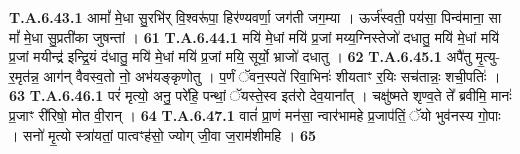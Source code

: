 \documentclass[17pt]{extarticle}
\begin{document}
                                                         \textbf{} \newline \newline
                                \textbf{ T.A.6.43.1} \newline
                  आमां᳚ मे॒धा सु॒रभि॑र् वि॒श्वरू॑पा॒ हिर॑ण्यवर्णा॒ जग॑ती जग॒म्या । ऊर्ज॑स्वती॒ पय॑सा॒ पिन्व॑माना॒ सा मां᳚ मे॒धा सु॒प्रती॑का जुषन्तां । \textbf{ 61} \newline
                  \newline
                                                         \textbf{} \newline \newline
                                \textbf{ T.A.6.44.1} \newline
                  मयि॑ मे॒धां मयि॑ प्र॒जां मय्य॒ग्निस्तेजो॑ दधातु॒ मयि॑ मे॒धां मयि॑ प्र॒जां मयीन्द्र॑ इन्द्रि॒यं द॑धातु॒ मयि॑ मे॒धां मयि॑ प्र॒जां मयि॒ सूर्यो॒ भ्राजो॑ दधातु । \textbf{ 62} \newline
                  \newline
                                                         \textbf{} \newline \newline
                                \textbf{ T.A.6.45.1} \newline
                  अपै॑तु मृ॒त्यु-र॒मृत॑न्न॒ आग॑न् वैवस्व॒तो नो॒ अभ॑यङ्कृणोतु । प॒र्णं ॅवन॒स्पते॑ रिवा॒भिनः॑ शीयताꣳ र॒यिः सच॑तान्नः॒ शची॒पतिः॑ । \textbf{ 63} \newline
                  \newline
                                                         \textbf{} \newline \newline
                                \textbf{ T.A.6.46.1} \newline
                  परं॑ मृत्यो॒ अनु॒ परे॑हि॒ पन्थां॒ ॅयस्ते॒स्व इत॑रो देव॒याना᳚त् । चक्षु॑ष्मते शृण्व॒ते ते᳚ ब्रवीमि॒ मानः॑ प्र॒जाꣳ री॑रिषो॒ मोत वी॒रान् । \textbf{ 64} \newline
                  \newline
                                                         \textbf{} \newline \newline
                                \textbf{ T.A.6.47.1} \newline
                  वातं॑ प्रा॒णं मन॑सा॒ न्वार॑भामहे प्र॒जाप॑तिं॒ ॅयो भुव॑नस्य गो॒पाः । सनो॑ मृ॒त्यो स्त्रा॑यतां॒ पात्वꣳह॑सो॒ ज्योग् जी॒वा ज॒राम॑शीमहि । \textbf{ 65} \newline
\end{document}
